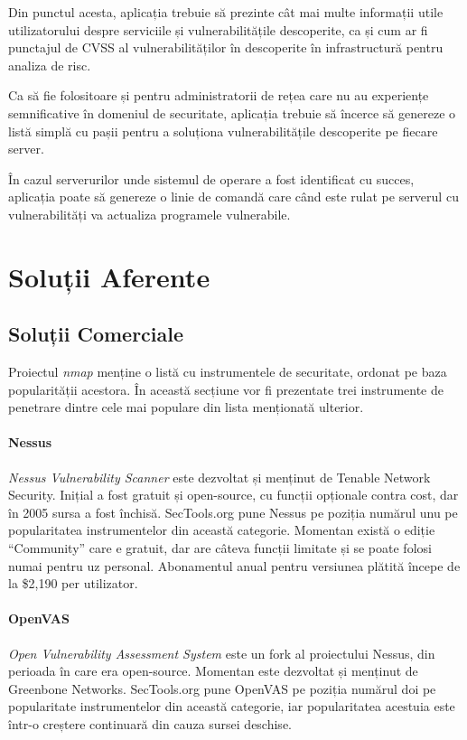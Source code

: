 	Din punctul acesta, aplicația trebuie să prezinte cât mai multe informații utile utilizatorului despre serviciile și vulnerabilitățile descoperite, ca și cum ar fi punctajul de CVSS al vulnerabilităților în descoperite în infrastructură pentru analiza de risc.
	
	Ca să fie folositoare și pentru administratorii de rețea care nu au experiențe semnificative în domeniul de securitate, aplicația trebuie să încerce să genereze o listă simplă cu pașii pentru a soluționa vulnerabilitățile descoperite pe fiecare server.
	
	În cazul serverurilor unde sistemul de operare a fost identificat cu succes, aplicația poate să genereze o linie de comandă care când este rulat pe serverul cu vulnerabilități va actualiza programele vulnerabile.

\section*{Soluții Aferente}
	
\subsection*{Soluții Comerciale}
	
	Proiectul \textit{nmap} menține o listă cu instrumentele de securitate, ordonat pe baza popularității acestora\cite{sectools}. În această secțiune vor fi prezentate trei instrumente de penetrare dintre cele mai populare din lista menționată ulterior.
	
	\paragraph*{Nessus} \textit{Nessus Vulnerability Scanner}\cite{nessus} este dezvoltat și menținut de Tenable Network Security. Inițial a fost gratuit și open-source, cu funcții opționale contra cost, dar în 2005 sursa a fost închisă. SecTools.org pune Nessus pe poziția numărul unu pe popularitatea instrumentelor din această categorie. Momentan există o ediție ``Community'' care e gratuit, dar are câteva funcții limitate și se poate folosi numai pentru uz personal. Abonamentul anual pentru versiunea plătită începe de la \$2,190 per utilizator.
	
	\paragraph*{OpenVAS} \textit{Open Vulnerability Assessment System}\cite{openvas} este un fork al proiectului Nessus, din perioada în care era open-source. Momentan este dezvoltat și menținut de Greenbone Networks. SecTools.org pune OpenVAS pe poziția numărul doi pe popularitate instrumentelor din această categorie, iar popularitatea acestuia este într-o creștere continuară din cauza sursei deschise.
	
